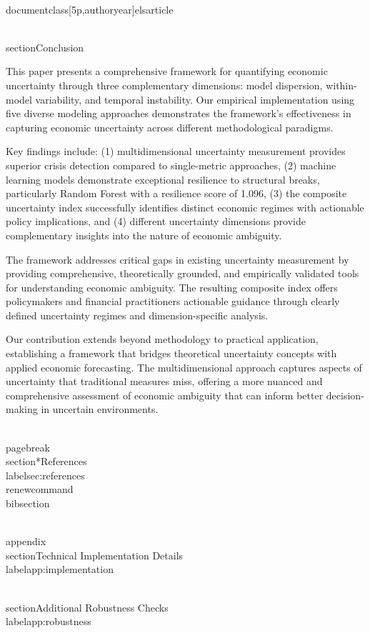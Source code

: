 \\documentclass[5p,authoryear]{elsarticle}
\begin{document}
\\section{Conclusion}

This paper presents a comprehensive framework for quantifying economic uncertainty through three complementary dimensions: model dispersion, within-model variability, and temporal instability. Our empirical implementation using five diverse modeling approaches demonstrates the framework's effectiveness in capturing economic uncertainty across different methodological paradigms.

Key findings include: (1) multidimensional uncertainty measurement provides superior crisis detection compared to single-metric approaches, (2) machine learning models demonstrate exceptional resilience to structural breaks, particularly Random Forest with a resilience score of 1.096, (3) the composite uncertainty index successfully identifies distinct economic regimes with actionable policy implications, and (4) different uncertainty dimensions provide complementary insights into the nature of economic ambiguity.

The framework addresses critical gaps in existing uncertainty measurement by providing comprehensive, theoretically grounded, and empirically validated tools for understanding economic ambiguity. The resulting composite index offers policymakers and financial practitioners actionable guidance through clearly defined uncertainty regimes and dimension-specific analysis.

Our contribution extends beyond methodology to practical application, establishing a framework that bridges theoretical uncertainty concepts with applied economic forecasting. The multidimensional approach captures aspects of uncertainty that traditional measures miss, offering a more nuanced and comprehensive assessment of economic ambiguity that can inform better decision-making in uncertain environments.

\\pagebreak
\\section*{References} \\label{sec:references}
\\renewcommand{\\bibsection}{}
\
\

\\appendix
\\section{Technical Implementation Details}
\\label{app:implementation}


\\section{Additional Robustness Checks}
\\label{app:robustness}


\
\end{document}
